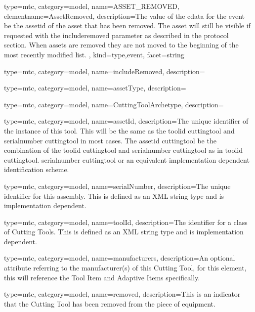 {
  type=mtc,
  category=model,
  name={ASSET\_REMOVED},
  elementname={AssetRemoved},
  description={The value of the \gls{cdata} for the event \MUST be the \gls{assetid} of the asset that has been removed. The asset will still be visible if requested with the \gls{includeremoved} parameter as described in the protocol section. When assets are removed they are not moved to the beginning of the most recently modified list. },
  kind={type,event},
  facet={\gls{string}}
}


{
  type=mtc,
  category=model,
  name={includeRemoved},
  description={}
}


{
  type=mtc,
  category=model,
  name={assetType},
  description={}
}


{
  type=mtc,
  category=model,
  name={CuttingToolArchetype},
  description={}
}


{
  type=mtc,
  category=model,
  name={assetId},
  description={The unique identifier of the instance of this tool. This will be the same as the \gls{toolid cuttingtool} and \gls{serialnumber cuttingtool} in most cases. The \gls{assetid cuttingtool} \SHOULD be the combination of the \gls{toolid cuttingtool} and \gls{serialnumber cuttingtool} as in \gls{toolid cuttingtool}. \gls{serialnumber cuttingtool} or an equivalent implementation dependent identification scheme.}
}


{
  type=mtc,
  category=model,
  name={serialNumber},
  description={The unique identifier for this assembly. This is defined as an XML string type and is implementation dependent.}
}


{
  type=mtc,
  category=model,
  name={toolId},
  description={The identifier for a class of Cutting Tools. This is defined as an XML string type and is implementation dependent. }
}


{
  type=mtc,
  category=model,
  name={manufacturers},
  description={An optional attribute referring to the manufacturer(s) of this Cutting Tool, for this element, this will reference the Tool Item and Adaptive Items specifically. }
}


{
  type=mtc,
  category=model,
  name={removed},
  description={This is an indicator that the Cutting Tool has been removed from the piece of equipment. }
}



